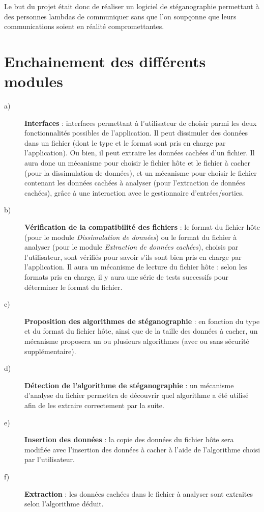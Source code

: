 \documentclass[11pt]{article}
\begin{document}
Le but du projet était donc de réaliser un logiciel de stéganographie permettant à des
personnes lambdas de communiquer sans que l'on soupçonne que leurs
communications soient en réalité compromettantes. 

\section{Enchainement des différents modules}

\begin{description}
\item[a)] \textbf{Interfaces} :
    interfaces permettant à l'utilisateur de choisir parmi les deux
    fonctionnalités possibles de l'application. Il peut dissimuler des
    données dans un fichier (dont le type et le format sont pris en charge
    par l'application). Ou bien, il peut extraire les données cachées d'un
    fichier. \newline
    Il aura donc un mécanisme pour choisir le fichier hôte et le fichier 
    à cacher (pour la dissimulation de données), et un mécanisme pour choisir le 
    fichier contenant les données cachées à analyser (pour l'extraction de 
    données cachées), grâce à une interaction avec le gestionnaire d’entrées/sorties. 

\item[b)] \textbf{Vérification de la compatibilité des fichiers} : le format 
	du fichier hôte (pour le module \textit{Dissimulation de données}) ou 
	le format du fichier à analyser (pour le module \textit{Extraction de données 
	cachées}), choisis par l'utilisateur, sont vérifiés pour savoir s'ils sont
	bien pris en charge par l'application. \newline
	Il aura un mécanisme de lecture du fichier hôte : selon les formats 
	pris en charge, il y aura une série de tests successifs pour déterminer le 
	format du fichier. 

\item[c)] \textbf{Proposition des algorithmes de stéganographie} : en fonction
    du type et du format du fichier hôte, ainsi que de la taille des données à
    cacher, un mécanisme proposera un ou plusieurs algorithmes (avec ou sans 
    sécurité supplémentaire).  

\item[d)] \textbf{Détection de l'algorithme de stéganographie} : un mécanisme 
	d'analyse du fichier permettra de découvrir quel algorithme a été utilisé 
	afin de les extraire correctement par la suite. 

\item[e)] \textbf{Insertion des données} : la copie des données du fichier hôte
    sera modifiée avec l'insertion des données à cacher à l'aide de l'algorithme
    choisi par l'utilisateur. 

\item[f)] \textbf{Extraction} : les données cachées dans le fichier à analyser
    sont extraites selon l'algorithme déduit.

\end{description}
\end{document}
